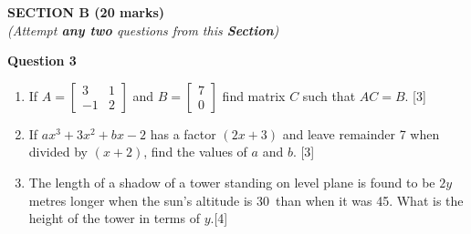 \newpage
\begin{center}
   \large
   \textbf{SECTION B (20 marks)}\\
   \vspace{5mm}
   \normalsize
   \textit{(Attempt \textbf{any two} questions from this \textbf{Section})}
\end{center}
\par

\noindent
\textbf{Question 3}
\begin{enumerate}[label=(\roman*)]

    \item If $A=\begin{bmatrix*} 3 & 1 \\ -1 & 2 \end{bmatrix*}$ and 
        $B=\begin{bmatrix*} 7 \\ 0 \end{bmatrix*}$ find matrix $C$ such 
        that $AC=B$. \hfill [3]

    \item If $ax^3 + 3x^2 + bx -2$ has a factor $(2x+3)$ and leave 
        remainder 7 when divided by $(x+2)$, find the values of 
        $a$ and $b$. \hfill [3]

    \item The length of a shadow of a tower standing on level plane 
        is found to be $2y$ metres longer when the sun's altitude
        is 30\degree \ than when it was 45\degree. What is the 
        height of the tower in terms of $y$.\hfill [4]


\end{enumerate}

